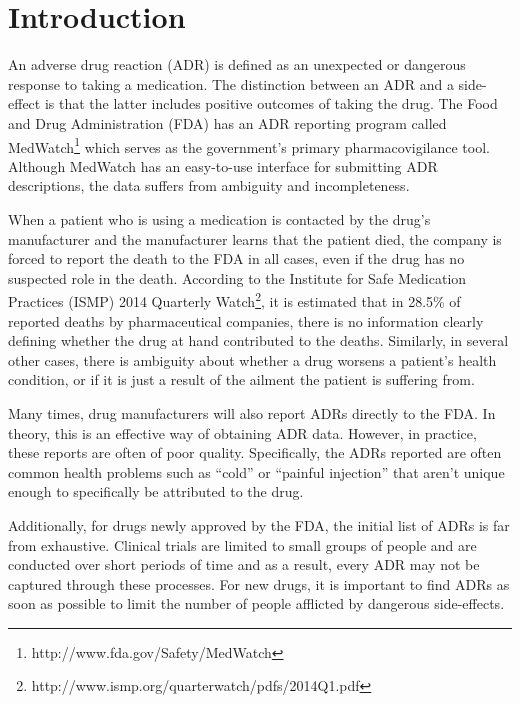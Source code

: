 \documentclass{acm_proc_article-sp}
\begin{document}


\section{Introduction}
An adverse drug reaction (ADR) is defined as an unexpected or dangerous response to taking a medication. The distinction between an ADR and a side-effect is that the latter includes positive outcomes of taking the drug. The Food and Drug Administration (FDA) has an ADR reporting program called MedWatch\footnote{http://www.fda.gov/Safety/MedWatch} which serves as the government's primary pharmacovigilance tool. Although MedWatch has an easy-to-use interface for submitting ADR descriptions, the data suffers from ambiguity and incompleteness. 

When a patient who is using a medication is contacted by the drug's manufacturer and the manufacturer learns that the patient died, the company is forced to report the death to the FDA in all cases, even if the drug has no suspected role in the death.  According to the Institute for Safe Medication Practices (ISMP) 2014 Quarterly Watch\footnote{http://www.ismp.org/quarterwatch/pdfs/2014Q1.pdf}, it is estimated that in 28.5\% of reported deaths by pharmaceutical companies, there is no information clearly defining whether the drug at hand contributed to the deaths. Similarly, in several other cases, there is ambiguity about whether a drug worsens a patient's health condition, or if it is just a result of the ailment the patient is suffering from. 

Many times, drug manufacturers will also report ADRs directly to the FDA. In theory, this is an effective way of obtaining ADR data. However, in practice, these reports are often of poor quality. Specifically, the ADRs reported are often common health problems such as ``cold'' or ``painful injection'' that aren't unique enough to specifically be attributed to the drug.

Additionally, for drugs newly approved by the FDA, the initial list of ADRs is far from exhaustive. Clinical trials are limited to small groups of people and are conducted over short periods of time and as a result, every ADR may not be captured through these processes. For new drugs, it is important to find ADRs as soon as possible to limit the number of people afflicted by dangerous side-effects.
\end{document}
